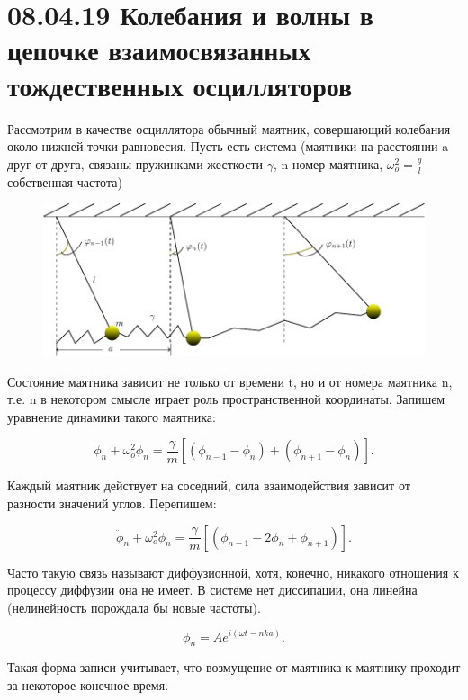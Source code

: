 
\usepackage{graphicx}
\usepackage{wrapfig}
\usepackage{ dsfont }
\usepackage{cancel}

\section{08.04.19 Колебания и волны в цепочке взаимосвязанных тождественных осцилляторов}

Рассмотрим в качестве осциллятора обычный маятник, совершающий колебания около нижней точки равновесия. Пусть есть система (маятники на расстоянии a друг от друга, связаны пружинками жесткости $\gamma$, n-номер маятника, $\omega_o^2=\frac{g}{l}$ - собственная частота)

\begin{figure}[h!]
	\centering
	\includegraphics[width=0.5\linewidth]{fig/fig1'.pdf}
	\label{fig:fig1}
\end{figure}

Состояние маятника зависит не только от времени t, но и от номера маятника n, т.е. n в некотором смысле играет роль пространственной координаты. Запишем уравнение динамики такого маятника:

\begin{equation}
	\ddot{\phi}_n+\omega^2_o \phi_n=\frac{\gamma}{m}[(\phi_{n-1}-\phi_n)+(\phi_{n+1}-\phi_n)].
	\label{eq:1}
\end{equation}

Каждый маятник действует на соседний, сила взаимодействия зависит от разности значений углов. Перепишем:

\begin{equation*}
	\ddot{\phi}_n+\omega^2_o \phi_n=\frac{\gamma}{m}[(\phi_{n-1}-2\phi_n+\phi_{n+1})].
\end{equation*}

Часто такую связь называют диффузионной, хотя, конечно, никакого отношения к процессу диффузии она не имеет. В системе нет диссипации, она линейна (нелинейность порождала бы новые частоты).

\begin{equation}
	\phi_n=A e^{i(\omega t-nka)}.
	\label{eq:2}
\end{equation}

Такая форма записи учитывает, что возмущение от маятника к маятнику проходит за некоторое конечное время.

